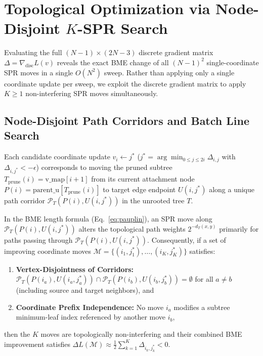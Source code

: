 \documentclass[11pt,a4paper]{article}
\theoremstyle{definition}
\begin{document}
\section{Topological Optimization via Node-Disjoint $K$-SPR Search}
\label{sec:optimizer}

Evaluating the full $(N-1) \times (2N-3)$ discrete gradient matrix $\Delta = \nabla_{\text{disc}} L(v)$ reveals the exact BME change of all $(N-1)^2$ single-coordinate SPR moves in a single $O(N^2)$ sweep. Rather than applying only a single coordinate update per sweep, we exploit the discrete gradient matrix to apply $K \ge 1$ non-interfering SPR moves simultaneously.

\subsection{Node-Disjoint Path Corridors and Batch Line Search}
Each candidate coordinate update $v_i \leftarrow j^*$ ($j^* = \arg\min_{0 \le j \le 2i} \Delta_{i, j}$ with $\Delta_{i, j^*} < -\epsilon$) corresponds to moving the pruned subtree $T_{\text{prune}}(i) = \text{v\_map}[i+1]$ from its current attachment node $P(i) = \text{parent\_u}[T_{\text{prune}}(i)]$ to target edge endpoint $U(i, j^*)$ along a unique path corridor $\mathcal{P}_T(P(i), U(i, j^*))$ in the unrooted tree $T$.

In the BME length formula (Eq.~\eqref{eq:pauplin}), an SPR move along $\mathcal{P}_T(P(i), U(i, j^*))$ alters the topological path weights $2^{-d_T(x,y)}$ primarily for paths passing through $\mathcal{P}_T(P(i), U(i, j^*))$. Consequently, if a set of improving coordinate moves $\mathcal{M} = \{(i_1, j_1^*), \dots, (i_K, j_K^*)\}$ satisfies:
\begin{enumerate}
    \item \textbf{Vertex-Disjointness of Corridors:} $\mathcal{P}_T(P(i_a), U(i_a, j_a^*)) \cap \mathcal{P}_T(P(i_b), U(i_b, j_b^*)) = \emptyset$ for all $a \neq b$ (including source and target neighbors), and
    \item \textbf{Coordinate Prefix Independence:} No move $i_a$ modifies a subtree minimum-leaf index referenced by another move $i_b$,
\end{enumerate}
then the $K$ moves are topologically non-interfering and their combined BME improvement satisfies $\Delta L(\mathcal{M}) \approx \frac{1}{2} \sum_{k=1}^K \Delta_{i_k, j_k^*} < 0$.
\end{document}
